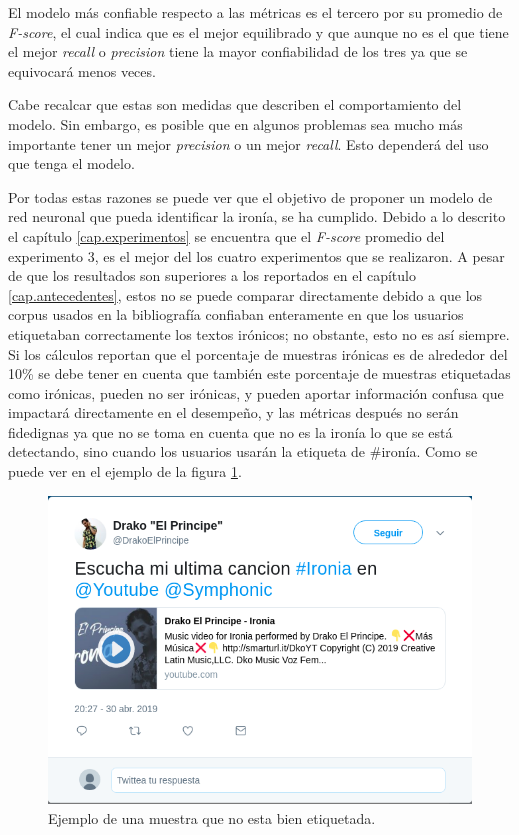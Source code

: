 \par El modelo más confiable respecto a las métricas es el tercero por su  promedio de \textit{F-score}, el cual indica que es el mejor equilibrado y que aunque  no es el que tiene el mejor \textit{recall} o \textit{precision} tiene la mayor confiabilidad de los tres ya que se equivocará menos veces.

\par Cabe recalcar que estas son medidas que describen el comportamiento del modelo. Sin embargo, es posible que en algunos problemas sea mucho más importante tener un mejor \textit{precision} o un mejor \textit{recall}. Esto dependerá del uso que tenga el modelo.

\par Por todas estas razones se puede ver que el objetivo de proponer un modelo de red neuronal que pueda identificar la ironía, se ha cumplido. Debido a lo descrito el capítulo \ref{cap.experimentos} se encuentra que el \textit{F-score} promedio del experimento 3, es el mejor del los cuatro experimentos que se realizaron. A pesar de que los resultados son superiores a los reportados en el capítulo \ref{cap.antecedentes}, estos no se puede comparar directamente debido a que los corpus usados en la bibliografía confiaban enteramente en que los usuarios etiquetaban correctamente los textos irónicos; no obstante, esto no es así siempre. Si los cálculos reportan que el porcentaje de muestras irónicas es de alrededor del 10\% se debe tener en cuenta que también este porcentaje de muestras etiquetadas como irónicas, pueden no ser irónicas, y pueden aportar información confusa que impactará directamente en el desempeño, y las métricas después no serán fidedignas ya que no se toma en cuenta que no es la ironía lo que se está detectando, sino cuando los usuarios usarán la etiqueta de \#ironía. Como se puede ver en el ejemplo de la figura \ref{fig:ejemploNoironia}.
\begin{figure}
	\centering
	\includegraphics[width=0.6\linewidth]{imagenes/ejemploIroniaNoironia.png}
	\caption{Ejemplo de una muestra que no esta bien etiquetada.}
	\label{fig:ejemploNoironia}
\end{figure}

